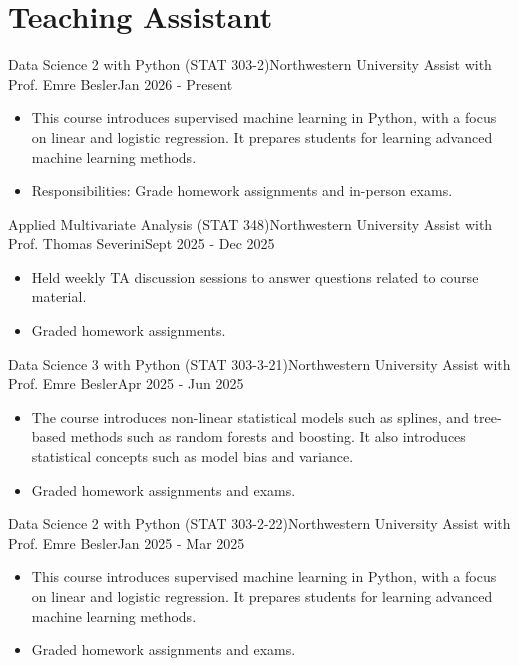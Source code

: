 \vspace{0.5pt}
\section{Teaching Assistant}
\resumeSubHeadingListStart
    \resumeSubheading
    {Data Science 2 with Python (STAT 303-2)}{Northwestern University}
    {Assist with Prof. Emre Besler}{Jan 2026 - Present}
    \begin{itemize}
        \item \small This course introduces supervised machine learning in Python, with a focus on linear and logistic regression. It prepares students for learning advanced machine learning methods.
        \item \small Responsibilities: Grade homework assignments and in-person exams.
    \end{itemize}
    \vspace{-5pt}

    \resumeSubheading
    {Applied Multivariate Analysis (STAT 348)}{Northwestern University}
    {Assist with Prof. Thomas Severini}{Sept 2025 - Dec 2025}
    \begin{itemize}
        \item \small Held weekly TA discussion sessions to answer questions related to course material.
        \item \small Graded homework assignments.
    \end{itemize}
    \vspace{-5pt}

    \resumeSubheading
    {Data Science 3 with Python (STAT 303-3-21)}{Northwestern University}
    {Assist with Prof. Emre Besler}{Apr 2025 - Jun 2025}
    \begin{itemize}
        \item \small The course introduces non-linear statistical models such as splines, and tree-based methods such as random forests and boosting. It also introduces statistical concepts such as model bias and variance.
        \item \small Graded homework assignments and exams. 
    \end{itemize}
    \vspace{-5pt}

    \resumeSubheading
    {Data Science 2 with Python (STAT 303-2-22)}{Northwestern University}
    {Assist with Prof. Emre Besler}{Jan 2025 - Mar 2025}
    \begin{itemize}
        \item \small This course introduces supervised machine learning in Python, with a focus on linear and logistic regression. It prepares students for learning advanced machine learning methods.
        \item \small Graded homework assignments and exams.
    \end{itemize}
    \vspace{-5pt}
    
